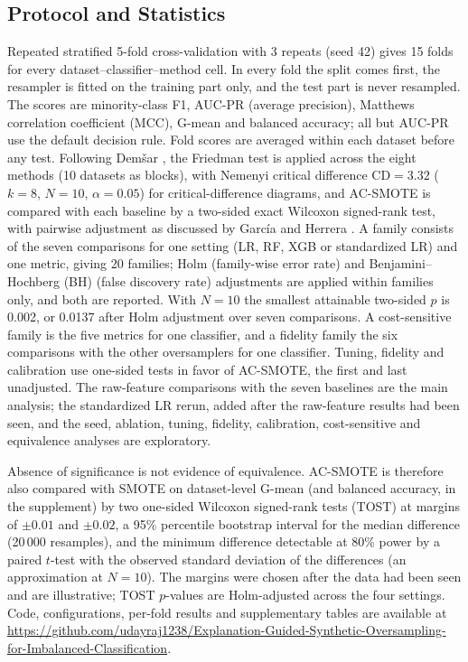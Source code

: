 \documentclass[conference,a4paper]{IEEEtran}
\newcommand{\acs}{AC-SMOTE}
\newcommand{\gmean}{\mbox{G-mean}}
\begin{document}
\subsection{Protocol and Statistics}\label{sec:protocol}
Repeated stratified 5-fold cross-validation with 3 repeats (seed 42) gives 15 folds for every dataset--classifier--method cell. In every fold the split comes first, the resampler is fitted on the training part only, and the test part is never resampled. The scores are minority-class F1, AUC-PR (average precision), Matthews correlation coefficient (MCC), \gmean{} \cite{kubat1997addressing} and balanced accuracy; all but AUC-PR use the default decision rule. Fold scores are averaged within each dataset before any test. Following Dem\v{s}ar \cite{demsar2006statistical}, the Friedman test is applied across the eight methods (10 datasets as blocks), with Nemenyi critical difference $\mathrm{CD}=3.32$ ($k=8$, $N=10$, $\alpha=0.05$) for critical-difference diagrams, and \acs{} is compared with each baseline by a two-sided exact Wilcoxon signed-rank test, with pairwise adjustment as discussed by Garc\'ia and Herrera \cite{garcia2008extension}. A family consists of the seven comparisons for one setting (LR, RF, XGB or standardized LR) and one metric, giving 20 families; Holm \cite{holm1979simple} (family-wise error rate) and Benjamini--Hochberg (BH) \cite{benjamini1995controlling} (false discovery rate) adjustments are applied within families only, and both are reported. With $N=10$ the smallest attainable two-sided $p$ is 0.002, or 0.0137 after Holm adjustment over seven comparisons. A cost-sensitive family is the five metrics for one classifier, and a fidelity family the six comparisons with the other oversamplers for one classifier. Tuning, fidelity and calibration use one-sided tests in favor of \acs{}, the first and last unadjusted. The raw-feature comparisons with the seven baselines are the main analysis; the standardized LR rerun, added after the raw-feature results had been seen, and the seed, ablation, tuning, fidelity, calibration, cost-sensitive and equivalence analyses are exploratory.

Absence of significance is not evidence of equivalence. \acs{} is therefore also compared with SMOTE on dataset-level \gmean{} (and balanced accuracy, in the supplement) by two one-sided Wilcoxon signed-rank tests (TOST) \cite{schuirmann1987comparison,lakens2017equivalence} at margins of $\pm0.01$ and $\pm0.02$, a 95\% percentile bootstrap interval for the median difference (20\,000 resamples), and the minimum difference detectable at 80\% power by a paired $t$-test with the observed standard deviation of the differences (an approximation at $N=10$). The margins were chosen after the data had been seen and are illustrative; TOST $p$-values are Holm-adjusted across the four settings. Code, configurations, per-fold results and supplementary tables are available at \url{https://github.com/udayraj1238/Explanation-Guided-Synthetic-Oversampling-for-Imbalanced-Classification}.
\end{document}
